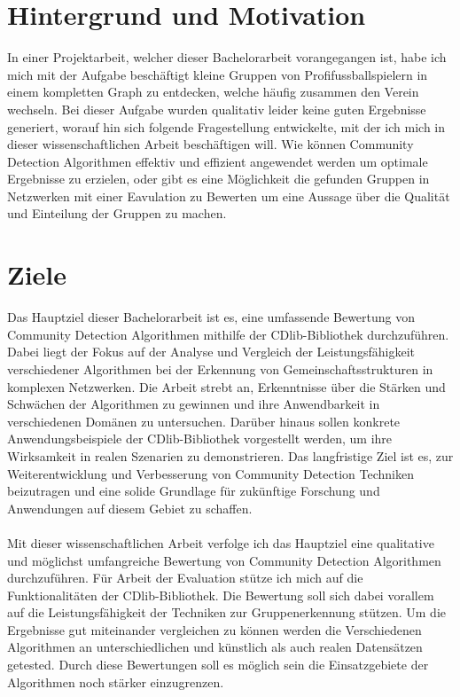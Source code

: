 \section{Hintergrund und Motivation}\label{Hintergrund und Motivation}
In einer Projektarbeit, welcher dieser Bachelorarbeit vorangegangen ist, habe ich mich mit der Aufgabe beschäftigt kleine Gruppen von Profifussballspielern in  einem kompletten Graph zu entdecken, welche häufig zusammen den Verein wechseln. Bei dieser Aufgabe wurden qualitativ leider keine guten Ergebnisse generiert, worauf hin sich folgende Fragestellung  entwickelte, mit der ich mich in dieser wissenschaftlichen Arbeit beschäftigen will. Wie können Community Detection Algorithmen effektiv und effizient angewendet werden um optimale Ergebnisse zu erzielen, oder gibt es eine Möglichkeit die gefunden Gruppen in Netzwerken mit einer Eavulation zu Bewerten um eine Aussage über die Qualität und Einteilung der Gruppen zu machen.

\section{Ziele}\label{Ziele}
Das Hauptziel dieser Bachelorarbeit ist es, eine umfassende Bewertung von Community Detection Algorithmen mithilfe der CDlib-Bibliothek durchzuführen. Dabei liegt der Fokus auf der Analyse und Vergleich der Leistungsfähigkeit verschiedener Algorithmen bei der Erkennung von Gemeinschaftsstrukturen in komplexen Netzwerken. Die Arbeit strebt an, Erkenntnisse über die Stärken und Schwächen der Algorithmen zu gewinnen und ihre Anwendbarkeit in verschiedenen Domänen zu untersuchen. Darüber hinaus sollen konkrete Anwendungsbeispiele der CDlib-Bibliothek vorgestellt werden, um ihre Wirksamkeit in realen Szenarien zu demonstrieren. Das langfristige Ziel ist es, zur Weiterentwicklung und Verbesserung von Community Detection Techniken beizutragen und eine solide Grundlage für zukünftige Forschung und Anwendungen auf diesem Gebiet zu schaffen.\\
\\
Mit dieser wissenschaftlichen Arbeit verfolge ich das Hauptziel eine qualitative und möglichst umfangreiche Bewertung von Community Detection Algorithmen durchzuführen. Für Arbeit der Evaluation stütze ich mich auf die Funktionalitäten der CDlib-Bibliothek. Die Bewertung soll sich dabei vorallem auf die Leistungsfähigkeit der Techniken zur Gruppenerkennung stützen. Um die Ergebnisse gut miteinander vergleichen zu können werden die Verschiedenen Algorithmen an unterschiedlichen und künstlich als auch realen Datensätzen getested. Durch diese Bewertungen soll es möglich sein die Einsatzgebiete der Algorithmen noch stärker einzugrenzen.

